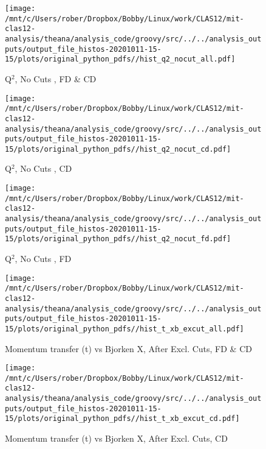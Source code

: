 \documentclass{article}
\begin{document}
\begin{landscape}
    \begin{figure}[h]
        \centering

        \texttt{[image: /mnt/c/Users/rober/Dropbox/Bobby/Linux/work/CLAS12/mit-clas12-analysis/theana/analysis\_code/groovy/src/../../analysis\_outputs/output\_file\_histos-20201011-15-15/plots/original\_python\_pdfs//hist\_q2\_nocut\_all.pdf]}
        \captionsetup{textformat=empty,labelformat=blank}
        \caption{Q$^{2}$, No Cuts , FD \& CD}
    \end{figure}
    \clearpage
    
    \begin{figure}[h]
        \centering

        \texttt{[image: /mnt/c/Users/rober/Dropbox/Bobby/Linux/work/CLAS12/mit-clas12-analysis/theana/analysis\_code/groovy/src/../../analysis\_outputs/output\_file\_histos-20201011-15-15/plots/original\_python\_pdfs//hist\_q2\_nocut\_cd.pdf]}
        \captionsetup{textformat=empty,labelformat=blank}
        \caption{Q$^{2}$, No Cuts , CD}
    \end{figure}
    \clearpage
    
    \begin{figure}[h]
        \centering

        \texttt{[image: /mnt/c/Users/rober/Dropbox/Bobby/Linux/work/CLAS12/mit-clas12-analysis/theana/analysis\_code/groovy/src/../../analysis\_outputs/output\_file\_histos-20201011-15-15/plots/original\_python\_pdfs//hist\_q2\_nocut\_fd.pdf]}
        \captionsetup{textformat=empty,labelformat=blank}
        \caption{Q$^{2}$, No Cuts , FD}
    \end{figure}
    \clearpage
    
    \begin{figure}[h]
        \centering

        \texttt{[image: /mnt/c/Users/rober/Dropbox/Bobby/Linux/work/CLAS12/mit-clas12-analysis/theana/analysis\_code/groovy/src/../../analysis\_outputs/output\_file\_histos-20201011-15-15/plots/original\_python\_pdfs//hist\_t\_xb\_excut\_all.pdf]}
        \captionsetup{textformat=empty,labelformat=blank}
        \caption{Momentum transfer (t) vs Bjorken X, After Excl. Cuts, FD \& CD}
    \end{figure}
    \clearpage
    
    \begin{figure}[h]
        \centering

        \texttt{[image: /mnt/c/Users/rober/Dropbox/Bobby/Linux/work/CLAS12/mit-clas12-analysis/theana/analysis\_code/groovy/src/../../analysis\_outputs/output\_file\_histos-20201011-15-15/plots/original\_python\_pdfs//hist\_t\_xb\_excut\_cd.pdf]}
        \captionsetup{textformat=empty,labelformat=blank}
        \caption{Momentum transfer (t) vs Bjorken X, After Excl. Cuts, CD}
    \end{figure}
    \clearpage
    

\end{landscape}
\end{document}
